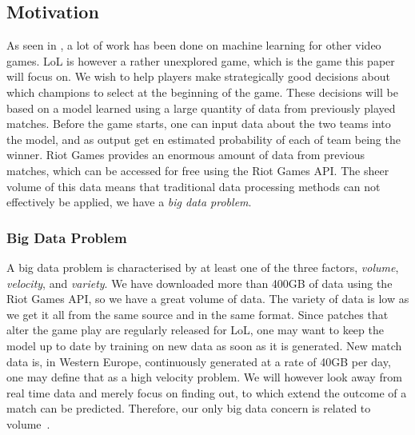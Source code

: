 \subsection{Motivation}\label{sec:motivation}%
As seen in , a lot of work has been done on machine learning for other video games. LoL is however a rather unexplored game, which is the game this paper will focus on. We wish to help players make strategically good decisions about which champions to select at the beginning of the game.
These decisions will be based on a model learned using a large quantity of data from previously played matches. Before the game starts, one can input data about the two teams into the model, and as output get en estimated probability of each of team being the winner.
Riot Games provides an enormous amount of data from previous matches, which can be accessed for free using the Riot Games API.\@
The sheer volume of this data means that traditional data processing methods can not effectively be applied, we have a \emph{big data problem}. 


\subsubsection{Big Data Problem}\label{sec:big_data_problem}
A big data problem is characterised by at least one of the three factors, \emph{volume}, \emph{velocity}, and \emph{variety}. We have downloaded more than 400GB of data using the Riot Games API, so we have a great volume of data. The variety of data is low as we get it all from the same source and in the same format. Since patches that alter the game play are regularly released for LoL, one may want to keep the model up to date by training on new data as soon as it is generated. 
New match data is, in Western Europe, continuously generated at a rate of 40GB per day, one may define that as a high velocity problem. We will however look away from real time data and merely focus on finding out, to which extend the outcome of a match can be predicted. Therefore, our only big data concern is related to volume~\cite{madden2012databases}.

